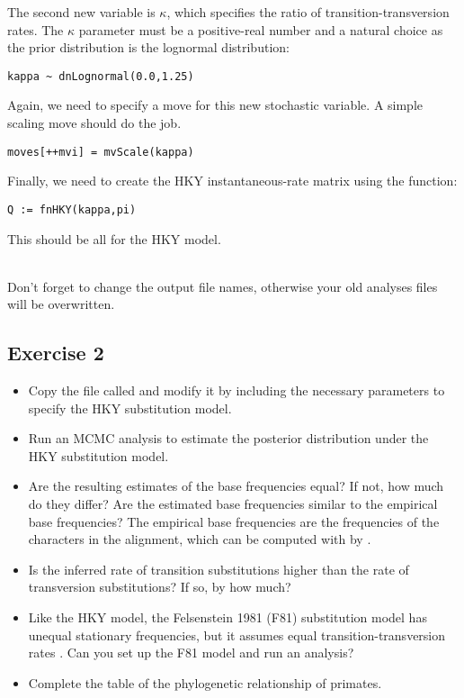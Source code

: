 The second new variable is $\kappa$, which specifies the ratio of transition-transversion rates.
The $\kappa$ parameter must be a positive-real number and a natural choice as the prior distribution is the lognormal distribution:
{\tt \begin{snugshade*}
\begin{lstlisting}
kappa ~ dnLognormal(0.0,1.25)
\end{lstlisting}
\end{snugshade*}}
Again, we need to specify a move for this new stochastic variable.
A simple scaling move should do the job.
{\tt \begin{snugshade*}
\begin{lstlisting}
moves[++mvi] = mvScale(kappa)
\end{lstlisting}
\end{snugshade*}}

Finally, we need to create the HKY instantaneous-rate matrix using the  function:
{\tt \begin{snugshade*}
\begin{lstlisting}
Q := fnHKY(kappa,pi)
\end{lstlisting}
\end{snugshade*}}
This should be all for the HKY model.

\noindent \\ \impmark Don't forget to change the output file names, otherwise your old analyses files will be overwritten.

\subsection{Exercise 2}

\begin{itemize}
\item Copy the file called   and modify it by including the necessary parameters to specify the HKY substitution model.
\item Run an MCMC analysis to estimate the posterior distribution under the HKY substitution model.
\item Are the resulting estimates of the base frequencies equal? 
	If not, how much do they differ? 
	Are the estimated base frequencies similar to the empirical base frequencies? 
	The empirical base frequencies are the frequencies of the characters in the alignment, which can be computed with \RevBayes by .
\item Is the inferred rate of transition substitutions higher than the rate of transversion substitutions? If so, by how much?
\item Like the HKY model, the Felsenstein 1981 (F81) substitution model has unequal stationary frequencies, but it assumes equal transition-transversion rates \citep{Felsenstein1981}.
	Can you set up the F81 model and run an analysis?
\item Complete the table of the phylogenetic relationship of primates.
\end{itemize}






